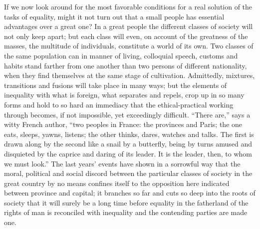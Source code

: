 \documentclass[12pt,a4paper,openany]{book}
\newcommand{\opage}[1]{\marginnote{\footnotesize\textit{[#1]}}}
\begin{document}
If we now look around for the most favorable conditions
for a real solution of the tasks of equality,
might it not turn out that a small people has
essential advantages over a great one? In a great people
the different classes of society will not only keep
apart; but each class will even, on account of
the greatness of the masses, the multitude of individuals, constitute
a world of its own. Two classes of the same population
can in manner of living, colloquial speech, customs and habits stand
\setcounter{footnote}{0}%
\opage{151}farther from one another than two persons of different nationality,
when they find themselves at the same stage of cultivation.
Admittedly, mixtures, transitions and fusions
will take place in many ways; but the elements of inequality
with what is foreign, what separates
and repels, crop up in so many
forms and hold to so hard an immediacy
that the ethical-practical working through becomes, if
not impossible, yet exceedingly difficult. ``There are,''
says a witty French author, ``two peoples in
France: the provinces and Paris; the one eats, sleeps,
yawns, listens; the other thinks, dares, watches and
talks. The first is drawn along by the second like a
snail by a butterfly, being by turns amused and
disquieted by the caprice and daring of its leader.
It is the leader, then, to whom we must look.'' The last
years' events have shown in a sorrowful way that the
moral, political and social discord between the particular
classes of society in the great country by no means confines
itself to the opposition here indicated between
province and capital; it branches so far and
cuts so deep into the roots of society that it will surely
be a long time before equality in the fatherland of the rights
of man is reconciled with inequality and the contending
parties are made one.
\end{document}
